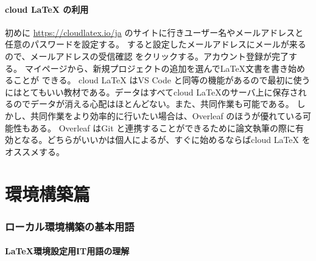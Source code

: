 \documentclass{ltjsarticle}
\begin{document}
\subsection{cloud LaTeX の利用}
初めに
\url{https://cloudlatex.io/ja}
のサイトに行きユーザー名やメールアドレスと任意のパスワードを設定する。
すると設定したメールアドレスにメールが来るので、メールアドレスの受信確認
をクリックする。アカウント登録が完了する。
マイページから、新規プロジェクトの追加を選んで\LaTeX 文書を書き始めることが
できる。
cloud LaTeX はVS Code と同等の機能があるので最初に使うにはとてもいい教材である。データはすべてcloud LaTeXのサーバ上に保存されるのでデータが消える心配はほとんどない。また、共同作業も可能である。
しかし、共同作業をより効率的に行いたい場合は、Overleaf のほうが優れている可能性もある。
Overleaf はGit と連携することができるために論文執筆の際に有効となる。どちらがいいかは個人によるが、すぐに始めるならばcloud LaTeX をオススメする。
\part{環境構築篇}
\section{ローカル環境構築の基本用語}
\subsection{\LaTeX 環境設定用IT用語の理解}
\end{document}
